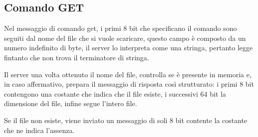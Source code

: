 \subsection{Comando GET}
Nel messaggio di comando get, i primi 8 bit che specificano il comando sono seguiti dal nome del file che si vuole scaricare, questo campo è composto da un numero indefinito di byte, il server lo interpreta come una stringa, pertanto legge fintanto che non trova il terminatore di stringa.


Il server una volta ottenuto il nome del file, controlla se è presente in memoria e, in caso affermativo, prepara il messaggio di risposta così strutturato:
i primi 8 bit contengono una costante che indica che il file esiste, i successivi 64 bit la dimensione del file, infine segue l'intero file.

	
Se il file non esiste, viene inviato un messaggio di soli 8 bit contente la costante che ne indica l'assenza.

